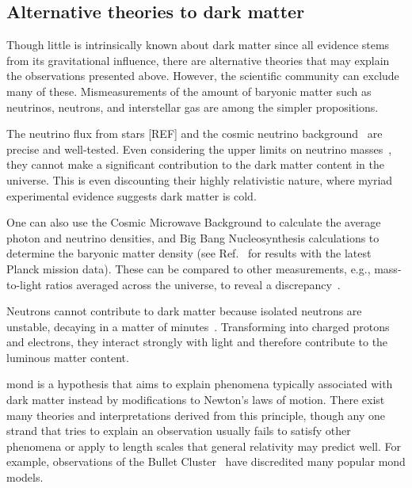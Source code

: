 

\subsection{Alternative theories to dark matter}
\label{subsec:intro_alternative_dm_theories}

Though little is intrinsically known about dark matter since all evidence stems from its gravitational influence, there are alternative theories that may explain the observations presented above. However, the scientific community can exclude many of these. Mismeasurements of the amount of baryonic matter such as neutrinos, neutrons, and interstellar gas are among the simpler propositions.

The neutrino flux from stars [REF] and the cosmic neutrino background~\cite{weinberg2008cosmology} are precise and well-tested. Even considering the upper limits on neutrino masses~\cite{Mertens:2016ihw}, they cannot make a significant contribution to the dark matter content in the universe. This is even discounting their highly relativistic nature, where myriad experimental evidence suggests dark matter is cold.

One can also use the Cosmic Microwave Background to calculate the average photon and neutrino densities, and Big Bang Nucleosynthesis calculations to determine the baryonic matter density (see Ref.~ for results with the latest Planck mission data). These can be compared to other measurements, e.g., mass-to-light ratios averaged across the universe, to reveal a discrepancy~\cite{cox2016universal}.

Neutrons cannot contribute to dark matter because isolated neutrons are unstable, decaying in a matter of minutes~\cite{PDGbooklet2010}. Transforming into charged protons and electrons, they interact strongly with light and therefore contribute to the luminous matter content.

\Gls{mond} is a hypothesis that aims to explain phenomena typically associated with dark matter instead by modifications to Newton's laws of motion. There exist many theories and interpretations derived from this principle, though any one strand that tries to explain an observation usually fails to satisfy other phenomena or apply to length scales that general relativity may predict well. For example, observations of the Bullet Cluster~\cite{BulletClusterDMevidence} have discredited many popular \acrshort{mond} models.


